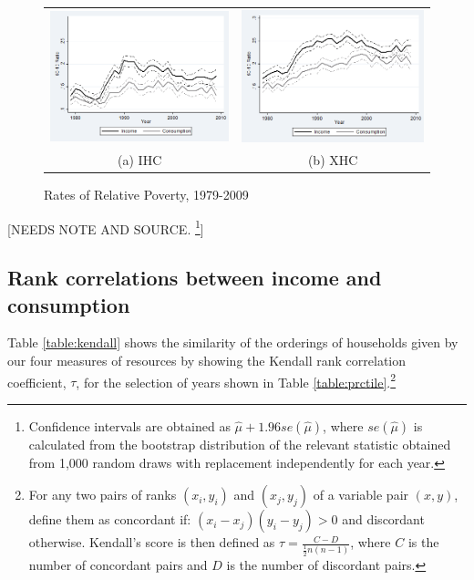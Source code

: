 \begin{figure}
\caption{Rates of Relative Poverty, 1979-2009}
\centering
\begin{tabular}{cc}
\includegraphics[width=.5\linewidth]{pictures/ihc_3.png} & \includegraphics[width=.5\linewidth]{pictures/xhc_3.png} \\
(a) IHC & (b) XHC \\
\end{tabular}
\label{fig:pov_trends}
\end{figure}

[NEEDS NOTE AND SOURCE. \footnote{Confidence intervals are obtained as $\hat{\mu} + 1.96se(\hat{\mu})$, where $se(\hat{\mu})$ is calculated from the bootstrap distribution of the relevant statistic obtained from 1,000 random draws with replacement independently for each year.}]



\subsection{Rank correlations between income and consumption}\label{subsec:ranks}


Table \ref{table:kendall} shows the similarity of the orderings of households given by our four measures of resources by showing the Kendall rank correlation coefficient, $\tau$, for the selection of years shown in Table \ref{table:prctile}.\footnote{For any two pairs of ranks $(x_{i},y_{i})$ and $(x_{j},y_{j})$ of a variable pair $(x, y)$, define them as concordant if: $(x_{i}-x_{j})(y_{i} - y_{j}) > 0$ and discordant otherwise. Kendall's score is then defined as $\tau = \frac{C-D}{\frac{1}{2}n(n-1)}$, where $C$ is the number of concordant pairs and $D$ is the number of discordant pairs.}

